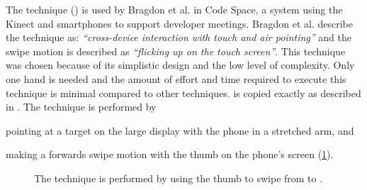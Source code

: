 The \swipe technique () is used by Bragdon et al. \cite{Bragdon:2011} in Code Space, a system using the Kinect and smartphones to support developer meetings. 
Bragdon et al. describe the technique as: \emph{``cross-device interaction with touch and air pointing''} and the swipe motion is described as \emph{``flicking up on the touch screen''}. 
This technique was chosen because of its simplistic design and the low level of complexity.
Only one hand is needed and the amount of effort and time required to execute this technique is minimal compared to other techniques.
\swipe is copied exactly as described in \cite{Bragdon:2011}.
The \swipe technique is performed by 
\begin{enumerate*}[label=\itshape\arabic*\upshape)]
	\item{pointing at a target on the large display with the phone in a stretched arm, and}
	\item{making a forwards swipe motion with the thumb on the phone's screen (\cref{fig:swipeTechnique}).}
\end{enumerate*}

\begin{figure}[H]
\caption{The \swipe technique is performed by using the thumb to swipe from \protect{} to \protect{}.}
\label{fig:swipeTechnique}
\end{figure}

